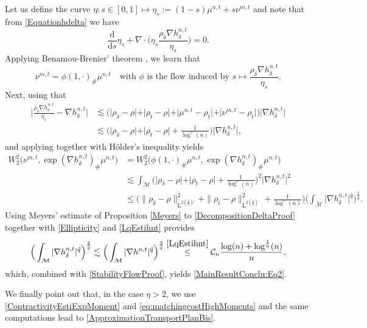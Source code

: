 \documentclass[11pt,a4paper,oneside]{amsart}
\numberwithin{equation}{section}
\newcommand{\dd}{\mathrm{d}}
\newcommand{\LL}{\mathrm{L}}
\begin{document}
%
\medskip
%

Let us define the curve $\eta: s\in [0,1]\mapsto \eta_s:=(1-s)\mu^{n,t}+s\nu^{m,t}$ and note that from \eqref{Equationhdelta} we have 
%
$$\frac{\dd}{\dd s}\eta_s+\nabla\cdot \Big(\eta_s\frac{\rho_\delta\nabla h^{n,t}_\delta}{\eta_s}\Big)=0.$$
%
Applying Benamou-Brenier' theorem \cite{benamou2000computational}, we learn that 
%
$$\nu^{m,t}=\phi(1,\cdot)_\#\mu^{n,t}\quad\text{with $\phi$ is the flow induced by $s\mapsto \frac{\rho_\delta\nabla h^{n,t}_\delta}{\eta_s}$}.$$
%
Next, using that 
%
\begin{align*}
%
\Big\vert \frac{\rho_\delta\nabla h^{n,t}_\delta}{\eta_s}-\nabla h^{n,t}_\delta\Big\vert&\lesssim \Big(\vert\rho_\delta-\rho\vert+\vert\rho_t-\rho\vert+\vert\mu^{n,t}-\rho_t\vert+\vert\nu^{m,t}-\rho_t\vert\Big)\vert\nabla h^{n,t}_\delta\vert\\
&\lesssim \Big(\vert\rho_\delta-\rho\vert+\vert\rho_t-\rho\vert+\frac{1}{\log^{\upsilon}(n)}\Big)\vert\nabla h^{n,t}_\delta\vert,
%
\end{align*}
%
and applying \cite[Proposition A.1]{ambrosio2019finer} together with Hölder's inequality yields
%
\begin{align}
%
W^2_2\big(\nu^{m,t},\exp(\nabla h^{n,t}_\delta)_\#\mu^{n,t}\big)&=W^2_2\big(\phi(1,\cdot)_\#\mu^{n,t},\exp(\nabla h^{n,t}_\delta)_\#\mu^{n,t}\big)\nonumber\\
&\lesssim \int_{\mathcal{M}}\Big(\vert\rho_\delta-\rho\vert+\vert\rho_t-\rho\vert+\frac{1}{\log^{\upsilon}(n)}\Big)^2\vert\nabla h^{n,t}_\delta\vert^2\nonumber\\
&\leq \big(\|\rho_{\delta}-\rho\|^{2}_{\LL^{2(\frac{\bar q}{2})'}}+\|\rho_{t}-\rho\|^{2}_{\LL^{2(\frac{\bar q}{2})'}}+\tfrac{1}{\log^{\upsilon}(n)}\big)\Big(\int_{\mathcal{M}}\vert\nabla h^{n,t}_\delta\vert^{\bar{q}}\Big)^{\frac{2}{\bar{q}}}.\label{StabilityFlowProof}
%
\end{align}
%
Using Meyers' estimate of Proposition \ref{Meyers} to \eqref{DecompositionDeltaProof} together with \eqref{Ellipticity} and \eqref{LqEstihnt} provides 
%
$$\Big(\int_{\mathcal{M}}\vert\nabla h^{n,t}_\delta\vert^{\bar{q}}\Big)^{\frac{2}{\bar{q}}}\lesssim \Big(\int_{\mathcal{M}}\vert\nabla h^{n,t}\vert^{\bar{q}}\Big)^{\frac{2}{\bar{q}}}\stackrel{\eqref{LqEstihnt}}{\leq} \mathcal{C}_n\frac{\log(n)+\log^{\frac{1}{\eta}}(n)}{n},$$
%
which, combined with \eqref{StabilityFlowProof}, yields \eqref{MainResultConclu:Eq2}.

%
\medskip
%

We finally point out that, in the case $\eta>2$, we use \eqref{ContractivityEstiExpMoment} and \eqref{eq:matchingcostHighMoments} and the same computations lead to \eqref{ApproximationTransportPlanBis}.
\end{document}
